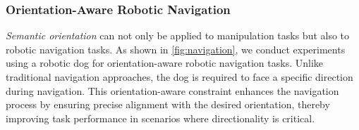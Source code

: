 \subsubsection{Orientation-Aware Robotic Navigation}
\textit{Semantic orientation} can not only be applied to manipulation tasks but also to robotic navigation tasks. As shown in \cref{fig:navigation}, we conduct experiments using a robotic dog for orientation-aware robotic navigation tasks.
 Unlike traditional navigation approaches, the dog is required to face a specific direction during navigation.
 This orientation-aware constraint enhances the navigation process by ensuring precise alignment with the desired orientation, thereby improving task performance in scenarios where directionality is critical.
